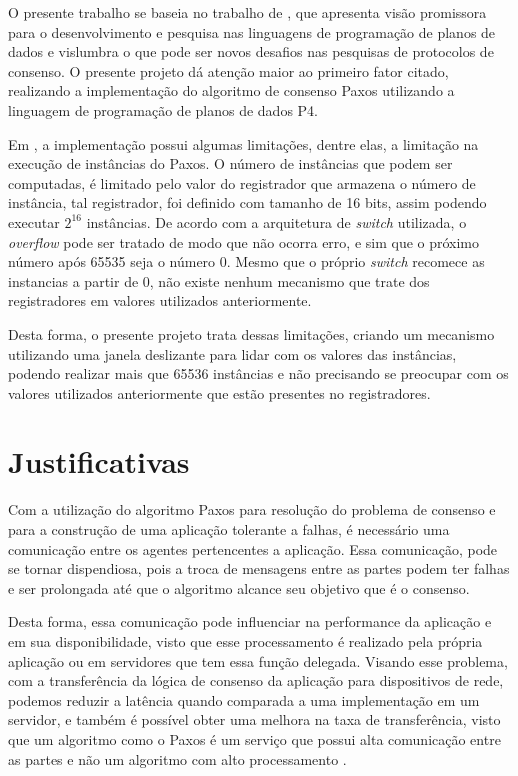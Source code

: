 \documentclass[
    12pt,
    openright, 
    oneside,
    a4paper,
    french,
    english,
    brazil
    ]{facom-ufu-abntex2}
\theoremstyle{definition}
\begin{document}
O presente trabalho se baseia no trabalho de \cite{dang2016paxos}, que apresenta visão
promissora para o desenvolvimento e pesquisa nas linguagens de programação de planos de dados 
e vislumbra o que pode ser novos desafios nas pesquisas de protocolos de consenso.
O presente projeto dá atenção maior ao primeiro fator citado, realizando a implementação do algoritmo de consenso Paxos utilizando a linguagem de programação de planos de dados P4. 

Em \cite{dang2016paxos}, a implementação possui algumas limitações, dentre elas, a limitação na execução de instâncias do Paxos. 
O número de instâncias que podem ser computadas, é limitado pelo valor do registrador que armazena o número de instância, tal registrador, foi definido com tamanho de 16 bits, assim podendo executar $2^{16}$ instâncias. De acordo com a arquitetura de \emph{switch} utilizada, o \emph{overflow} pode ser tratado de modo que não ocorra erro, e sim que o próximo número após 65535 seja o número 0. 
Mesmo que o próprio \emph{switch} recomece as instancias a partir de 0, não existe nenhum mecanismo que trate dos registradores em valores utilizados anteriormente. 

Desta forma, o presente projeto trata dessas limitações, criando um mecanismo utilizando uma
janela deslizante para lidar com os valores das instâncias, podendo realizar mais que
65536 instâncias e não precisando se preocupar com os valores utilizados anteriormente
que estão presentes no registradores.

\section{Justificativas}
Com a utilização do algoritmo Paxos para resolução do problema de consenso e para a 
construção de uma aplicação tolerante a falhas, é necessário uma comunicação entre os 
agentes pertencentes a aplicação. Essa comunicação, pode se tornar dispendiosa, pois 
a troca de mensagens entre as partes podem ter falhas e ser prolongada até que o 
algoritmo alcance seu objetivo que é o consenso.

Desta forma, essa comunicação pode influenciar na performance da aplicação e em 
sua disponibilidade, visto que esse processamento é realizado pela própria aplicação ou 
em servidores que tem essa função delegada. Visando esse problema, com a transferência
da lógica de consenso da aplicação para dispositivos de rede, podemos reduzir a latência
quando comparada a uma implementação em um servidor, e também é possível obter uma melhora
na taxa de transferência, visto que um algoritmo como o Paxos é um serviço que possui
alta comunicação entre as partes e não um algoritmo com alto processamento
\cite{netchainRtt}.
\end{document}
